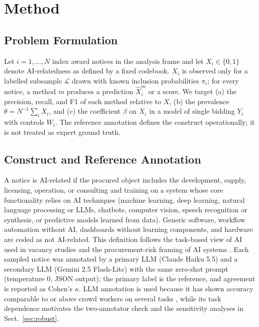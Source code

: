 \section{Method}
\subsection{Problem Formulation}
Let $i=1,\dots,N$ index award notices in the analysis frame and let $X_i\in\{0,1\}$ denote AI-relatedness as defined by a fixed codebook. $X_i$ is observed only for a labelled subsample $\mathcal{L}$ drawn with known inclusion probabilities $\pi_i$; for every notice, a method $m$ produces a prediction $\hat{X}^m_i$ or a score. We target (a) the precision, recall, and F1 of each method relative to $X$, (b) the prevalence $\theta=N^{-1}\sum_i X_i$, and (c) the coefficient $\beta$ on $X_i$ in a model of single bidding $Y_i$ with controls $W_i$. The reference annotation defines the construct operationally; it is not treated as expert ground truth.

\subsection{Construct and Reference Annotation}
A notice is AI-related if the procured object includes the development, supply, licensing, operation, or consulting and training on a system whose core functionality relies on AI techniques (machine learning, deep learning, natural language processing or LLMs, chatbots, computer vision, speech recognition or synthesis, or predictive models learned from data). Generic software, workflow automation without AI, dashboards without learning components, and hardware are coded as not AI-related. This definition follows the task-based view of AI used in vacancy studies \cite{acemoglu2022} and the procurement-risk framing of AI systems \cite{hickok2022}. Each sampled notice was annotated by a primary LLM (Claude Haiku 5.5) and a secondary LLM (Gemini 2.5 Flash-Lite) with the same zero-shot prompt (temperature 0, JSON output); the primary label is the reference, and agreement is reported as Cohen's $\kappa$. LLM annotation is used because it has shown accuracy comparable to or above crowd workers on several tasks \cite{gilardi2023}, while its task dependence \cite{ziems2024} motivates the two-annotator check and the sensitivity analyses in Sect.~\ref{sec:robust}.

